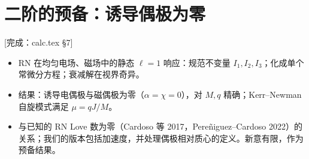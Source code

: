 \documentclass[11pt,a4paper]{ctexart}
\newcommand{\status}[1]{\hfill{\small\color{blue!50!black}[#1]}}
\begin{document}
\section{二阶的预备：诱导偶极为零}\label{sec:o-dipole}
\status{完成：calc.tex \S7}
\begin{itemize}[nosep]
\item RN 在均匀电场、磁场中的静态 $\ell=1$ 响应：规范不变量 $I_1,I_2,I_3$；化成单个常微分方程；衰减解在视界奇异。
\item 结果：诱导电偶极与磁偶极为零（$\alpha=\chi=0$），对 $M,q$ 精确；Kerr--Newman 自旋模式满足 $\mu=qJ/M$。
\item 与已知的 RN Love 数为零（Cardoso 等 2017，Pere\~niguez--Cardoso 2022）的关系；我们的版本包括加速度，并处理偶极相对质心的定义。新意有限，作为预备结果。
\end{itemize}

\end{document}
